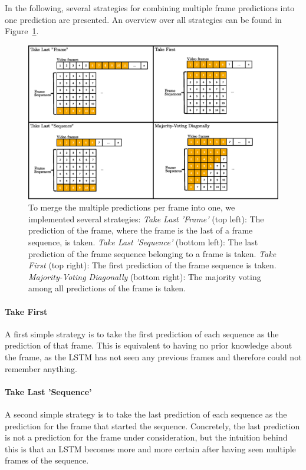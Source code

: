 In the following, several strategies for combining multiple frame predictions into one prediction are presented.
An overview over all strategies can be found in Figure~\ref{fig:merging_strategies}.
\begin{figure}[!htb]
	\centering
	\includegraphics[scale=.5]{images/merging_strategies.eps}
	\caption{To merge the multiple predictions per frame into one, we implemented several strategies:
    \textit{Take Last 'Frame'} (top left): The prediction of the frame, where the frame is the last of a frame sequence, is taken.
    \textit{Take Last 'Sequence'} (bottom left): The last prediction of the frame sequence belonging to a frame is taken.
    \textit{Take First} (top right): The first prediction of the frame sequence is taken.
    \textit{Majority-Voting Diagonally} (bottom right): The majority voting among all predictions of the frame is taken.}
	\label{fig:merging_strategies}
\end{figure}
\paragraph{Take First}
A first simple strategy is to take the first prediction of each sequence as the prediction of that frame.
This is equivalent to having no prior knowledge about the frame, as the LSTM has not seen any previous frames and therefore could not remember anything.

\paragraph{Take Last 'Sequence'}
A second simple strategy is to take the last prediction of each sequence as the prediction for the frame that started the sequence.
Concretely, the last prediction is not a prediction for the frame under consideration, but the intuition behind this is that an LSTM becomes more and more certain after having seen multiple frames of the sequence.

